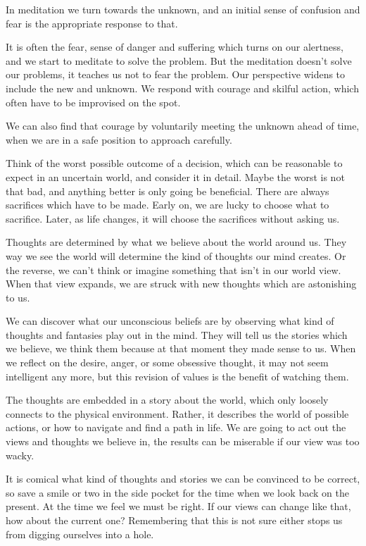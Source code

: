 In meditation we turn towards the unknown, and an initial sense of
confusion and fear is the appropriate response to that.

It is often the fear, sense of danger and suffering which turns on our
alertness, and we start to meditate to solve the problem. But the
meditation doesn't solve our problems, it teaches us not to fear the
problem. Our perspective widens to include the new and unknown. We
respond with courage and skilful action, which often have to be
improvised on the spot.

We can also find that courage by voluntarily meeting the unknown ahead
of time, when we are in a safe position to approach carefully.

Think of the worst possible outcome of a decision, which can be
reasonable to expect in an uncertain world, and consider it in detail.
Maybe the worst is not that bad, and anything better is only going be
beneficial. There are always sacrifices which have to be made. Early on,
we are lucky to choose what to sacrifice. Later, as life changes, it
will choose the sacrifices without asking us.

Thoughts are determined by what we believe about the world around us.
They way we see the world will determine the kind of thoughts our mind
creates. Or the reverse, we can't think or imagine something that isn't
in our world view. When that view expands, we are struck with new
thoughts which are astonishing to us.

We can discover what our unconscious beliefs are by observing what kind
of thoughts and fantasies play out in the mind. They will tell us the
stories which we believe, we think them because at that moment they made
sense to us. When we reflect on the desire, anger, or some obsessive
thought, it may not seem intelligent any more, but this revision of
values is the benefit of watching them.

The thoughts are embedded in a story about the world, which only loosely
connects to the physical environment. Rather, it describes the world of
possible actions, or how to navigate and find a path in life. We are
going to act out the views and thoughts we believe in, the results can
be miserable if our view was too wacky.

It is comical what kind of thoughts and stories we can be convinced to
be correct, so save a smile or two in the side pocket for the time when
we look back on the present. At the time we feel we must be right. If
our views can change like that, how about the current one? Remembering
that this is not sure either stops us from digging ourselves into a
hole.

